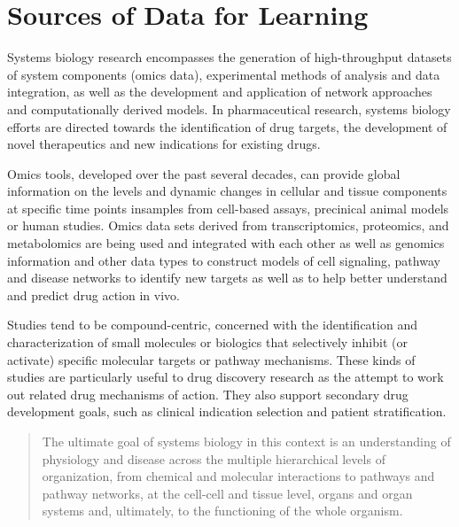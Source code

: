 


\section{Sources of Data for Learning}

Systems biology research encompasses the generation of high-throughput datasets of system components (omics data), experimental methods of analysis and data integration, as well as the development and application of network approaches and computationally derived models. \cite{Berg2014} In pharmaceutical research, systems biology efforts are directed towards the identification of drug targets, the development of novel therapeutics and new indications for existing drugs.

Omics tools, developed over the past several decades, can provide global information on the levels and dynamic changes in cellular and tissue components at specific time points insamples from cell-based assays, precinical animal models or human studies. Omics data sets derived from transcriptomics, proteomics, and metabolomics are being used and integrated with each other as well as genomics information and other data types to construct models of cell signaling, pathway and disease networks to identify new targets as well as to help better understand and predict drug action in vivo.

Studies tend to be compound-centric, concerned with the identification and characterization of small molecules or biologics that selectively inhibit (or activate) specific molecular targets or pathway mechanisms. These kinds of studies are particularly useful to drug discovery research as the attempt to work out related drug mechanisms of action. They also support secondary drug development goals, such as clinical indication selection and patient stratification. \cite{Berg2014}

\begin{quote}
The ultimate goal of systems biology in this context is an understanding of physiology and disease across the multiple hierarchical levels of organization, from chemical and molecular interactions to pathways and pathway networks, at the cell-cell and tissue level, organs and organ systems and, ultimately, to the functioning of the whole organism.
\end{quote}


